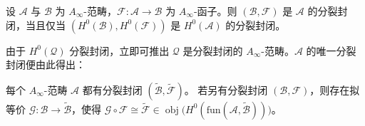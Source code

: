 \begin{Cor}\label{cor:4.12}
设 $\mathcal A$ 与 $\mathcal B$ 为 $A_\infty$-范畴，$\mathcal F:\mathcal A\to\mathcal B$
为 $A_\infty$-函子。则 $(\mathcal B,\mathcal F)$ 是 $\mathcal A$ 的分裂封闭，当且仅当
$(H^0(\mathcal B),H^0(\mathcal F))$ 是 $H^0(\mathcal A)$ 的分裂封闭。
\end{Cor}

由于 $H^0(\mathcal Q)$ 分裂封闭，立即可推出 $\mathcal Q$ 是分裂封闭的
$A_\infty$-范畴。$\mathcal A$ 的唯一分裂封闭便由此得出：

\begin{Pro}\label{pro:4.13}
每个 $A_\infty$-范畴 $\mathcal A$ 都有分裂封闭 $(\widetilde{\mathcal B},\widetilde{\mathcal F})$。
若另有分裂封闭 $(\mathcal B,\mathcal F)$，则存在拟等价
$\mathcal G:\mathcal B\to\widetilde{\mathcal B}$，使得
$\mathcal G\circ\mathcal F\cong\widetilde{\mathcal F}
\in\operatorname{obj}\bigl(H^0(\mathrm{fun}(\mathcal A,\widetilde{\mathcal B}))\bigr)$。
\end{Pro}

